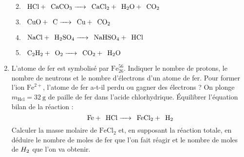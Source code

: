 \documentclass[a4paper,french,bookmarks]{article}
\begin{document}
\begin{enumerate}
\begin{enumerate}
            
            \item $\phantom{2}\text{HCl} + \phantom{1}\text{CaCO}_3 \xrightarrow{\hspace{0.4cm}} \phantom{1}\text{CaCl}_2 + \phantom{1}\text H_2 \text O + \phantom{1}\text{CO}_2$
            
            
            \item $\phantom{2}\text{CuO} + \phantom{1}\text C \xrightarrow{\hspace{0.4cm}} \phantom{2}\text{Cu} + \phantom{1}\text{CO}_2$
            
            
            \item $\phantom{1}\text{NaCl} + \phantom{1}\text H_2\text{SO}_4 \xrightarrow{\hspace{0.4cm}} \phantom{1}\text{NaHSO}_4 + \phantom{1}\text{HCl}$
            
            
            \item $\phantom{2}\text C_2 \text H_2 + \phantom{5}\text O_2 \xrightarrow{\hspace{0.4cm}} \phantom{4}\text{CO}_2 + \phantom{2}\text H_2 \text O$
            
        \end{enumerate}
        
        \item L'atome de fer est symbolisé par $\text{Fe}^{56}_{26}$. Indiquer le nombre de protons, le nombre de neutrons et le nombre d'électrons d'un atome de fer. Pour former l'ion $\text{Fe}^{2+}$, l'atome de fer a-t-il perdu ou gagner des électrons ? On plonge $m_\text{Hcl} = \qty{32}{\g}$ de paille de fer dans l'acide chlorhydrique. Équilibrer l'équation bilan de la réaction :
        \[ \phantom{1}\text{Fe} + \phantom{2}\text{HCl} \xrightarrow{\hspace{0.4cm}} \phantom{1}\text{FeCl}_2 + \phantom{1}\text H_2\]
        Calculer la masse molaire de $\text{FeCl}_2$ et, en supposant la réaction totale, en déduire le nombre de moles de fer que l'on fait réagir et le nombre de moles de $H_\text 2$ que l'on va obtenir.
        

\end{enumerate}
\end{document}
